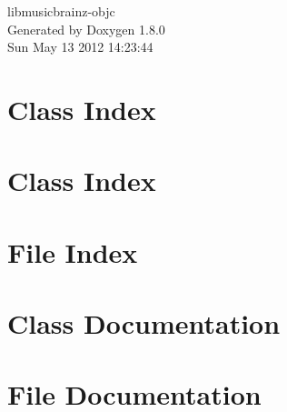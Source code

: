 \documentclass{book}
\begin{document}
\hypersetup{pageanchor=false,citecolor=blue}
\begin{titlepage}
\vspace*{7cm}
\begin{center}
{\Large libmusicbrainz-\/objc }\\
\vspace*{1cm}
{\large Generated by Doxygen 1.8.0}\\
\vspace*{0.5cm}
{\small Sun May 13 2012 14:23:44}\\
\end{center}
\end{titlepage}
\clearemptydoublepage
{}
\tableofcontents
\clearemptydoublepage
{}
\hypersetup{pageanchor=true,citecolor=blue}
\chapter{Class Index}

\chapter{Class Index}

\chapter{File Index}

\chapter{Class Documentation}









\chapter{File Documentation}

















\printindex
\end{document}

